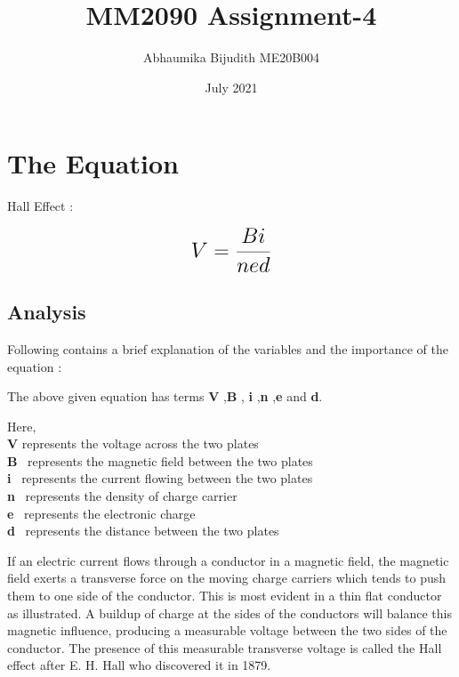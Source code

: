 \documentclass[a4paper, 13pt]{article}
\begin{document}
\title{MM2090 Assignment-4}
\author{Abhaumika Bijudith ME20B004}
\date{July 2021}
\maketitle

\section{The Equation}




Hall Effect  :  

\begin{equation}
 {\LARGE{\textbf{$V =\frac{Bi}{{ned}}$}}}
 \label{eqn:equation}
\end{equation}


\subsection{Analysis}
Following contains a brief explanation of the variables and the importance of the equation :
\begin{itemize}

    {\normalsize {The above given equation has terms \textbf{V} ,\textbf{B} , \textbf{i} ,\textbf{n} ,\textbf{e} and  \textbf{d}.}}

{\normalsize { Here,}}\\
{\normalsize {\textbf{V} represents the voltage across the two plates }}\\
{\normalsize {\textbf{B} \  represents the magnetic field between the two plates}}\\
{\normalsize {\textbf{i} \  represents the current flowing between the two plates}}\\
{\normalsize {\textbf{n} \  represents the density of charge carrier}}\\
{\normalsize{\textbf{e} \ represents the electronic charge}}\\
{\normalsize{\textbf{d} \ represents the distance between the two plates}}
\end{itemize}


If an electric current flows through a conductor in a magnetic field, the magnetic field exerts a transverse force on the moving charge carriers which tends to push them to one side of the conductor. This is most evident in a thin flat conductor as illustrated. A buildup of charge at the sides of the conductors will balance this magnetic influence, producing a measurable voltage between the two sides of the conductor. The presence of this measurable transverse voltage is called the Hall effect after E. H. Hall who discovered it in 1879.
\end{document}
